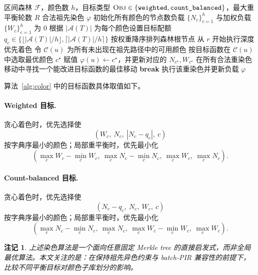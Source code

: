 \documentclass[UTF8]{ctexart}
\newtheorem{remark}{注记}[section]
\begin{document}
	\begin{algorithm}[H]
		\caption{目标驱动的直接祖先染色}
		\label{alg:color}
		\begin{algorithmic}[1]
			\Require 区间森林 $\mathcal{F}$，颜色数 $h$，目标类型 $\textsc{Obj}\in\{\texttt{weighted},\texttt{count\_balanced}\}$，最大重平衡轮数 $R$
			\Ensure 合法祖先染色 $\varphi$
			\State 初始化所有颜色的节点数负载 $\{N_c\}_{c=1}^{h}$ 与加权负载 $\{W_c\}_{c=1}^{h}$ 为 $0$
			\State 根据 $|\mathcal{A}(T)|$ 为每个颜色设置目标配额 $q_c\in\{\lfloor |\mathcal{A}(T)|/h \rfloor,\lceil |\mathcal{A}(T)|/h \rceil\}$
			\EndIf
			\State 按权重降序排列森林根节点
			\State 从 $r$ 开始执行深度优先着色
			\State 令 $\mathcal{C}(u)$ 为所有未出现在祖先路径中的可用颜色
			\State 按目标函数在 $\mathcal{C}(u)$ 中选取最优颜色 $c^\star$
			\State 赋值 $\varphi(u)\gets c^\star$，并更新对应的 $N_{c^\star},W_{c^\star}$
			\EndFor
			\EndFor
			\State 在所有合法重染色移动中寻找一个能改进目标函数的最佳移动
			\State \textbf{break}
			\Else
			\State 执行该重染色并更新负载
			\EndIf
			\EndFor
			\State \Return $\varphi$
		\end{algorithmic}
	\end{algorithm}
	
	算法~\ref{alg:color} 中的目标函数具体取值如下。
	
	\paragraph{Weighted 目标.}
	贪心着色时，优先选择使
	\[
	(W_c,\ N_c,\ |N_c-q_c|,\ c)
	\]
	按字典序最小的颜色；局部重平衡时，优先最小化
	\[
	(\max_c W_c - \min_c W_c,\ \max_c N_c - \min_c N_c,\ \max_c W_c,\ \max_c N_c).
	\]
	
	\paragraph{Count-balanced 目标.}
	贪心着色时，优先选择使
	\[
	(N_c-q_c,\ N_c,\ W_c,\ c)
	\]
	按字典序最小的颜色；局部重平衡时，优先最小化
	\[
	(\max_c N_c - \min_c N_c,\ \max_c N_c,\ \max_c W_c - \min_c W_c,\ \max_c W_c).
	\]
	
	\begin{remark}
		上述染色算法是一个面向任意固定 Merkle tree 的直接启发式，而非全局最优算法。本文关注的是：在保持祖先异色约束与 batch-PIR 兼容性的前提下，比较不同平衡目标对颜色子库划分的影响。
	\end{remark}
	
\end{document}
